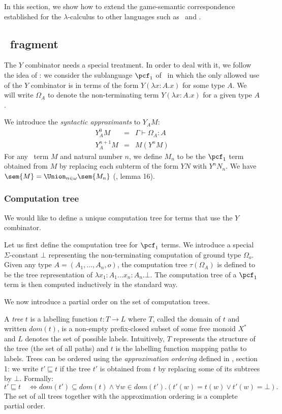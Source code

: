 In this section, we show how to extend the game-semantic correspondence
established for the $\lambda$-calculus to other languages such as \pcf\ and \ialgol.

\subsection{\pcf\ fragment}

The $Y$ combinator needs a special treatment. In order to deal with
it, we follow the idea of \cite{abramsky:game-semantics-tutorial}:
we consider the sublanguage $\pcf_1$ of \pcf\ in which the only
allowed use of the $Y$ combinator is in terms of the form $Y(
\lambda x:A .x )$ for some type $A$. We will write $\Omega_A$ to
denote the non-terminating term $Y(\lambda x:A .x)$ for a given type
$A$.

We introduce the \emph{syntactic approximants} to $Y_A M$:
\begin{eqnarray*}
Y^0_A M &=& \Gamma \vdash \Omega_A : A\\
Y^{n+1}_A M &=& M( Y^n M )
\end{eqnarray*}
For any \pcf\ term $M$ and natural number $n$, we define $M_n$ to be
the $\pcf_1$ term obtained from $M$ by replacing each subterm of the
form $Y N$ with $Y^n N_n$. We have $\sem{M} = \Union_{n\in\omega}
\sem{M_n}$ (\cite{abramsky:game-semantics-tutorial}, lemma 16).


\subsubsection{Computation tree}

We would like to define a unique computation tree for terms that use
the $Y$ combinator.

Let us first define the computation tree for $\pcf_1$ terms. We
introduce a special $\Sigma$-constant $\bot$ representing the
non-terminating computation of ground type $\Omega_o$. Given any
type $A = (A_1, \ldots, A_n, o)$, the computation tree
$\tau(\Omega_A)$ is defined to be the tree representation of
$\lambda x_1:A_1 \ldots x_n:A_n . \bot$. The computation tree of a
$\pcf_1$ term is then computed inductively in the standard way.

We now introduce a partial order on the set of computation trees.

A \emph{tree} $t$ is a labelling function $t:T\rightarrow L$ where
$T$, called the domain of $t$ and written $dom(t)$, is a non-empty
prefix-closed subset of some free monoid $X^*$ and $L$ denotes the
set of possible labels. Intuitively, $T$ represents the structure of
the tree (the set of all paths) and $t$ is the labelling function
mapping paths to labels. Trees can be ordered using the
\emph{approximation ordering} defined in \cite{KNU02}, section 1: we
write $t' \sqsubseteq t$ if the tree $t'$ is obtained from $t$ by
replacing some of its subtrees by $\bot$. Formally:
$$t' \sqsubseteq t \quad \iff dom(t') \subseteq dom(t) \wedge \forall  w \in dom(t'). (t'(w) = t(w) \vee t'(w) = \bot).$$
The set of all trees together with the approximation ordering is a
complete partial order.

